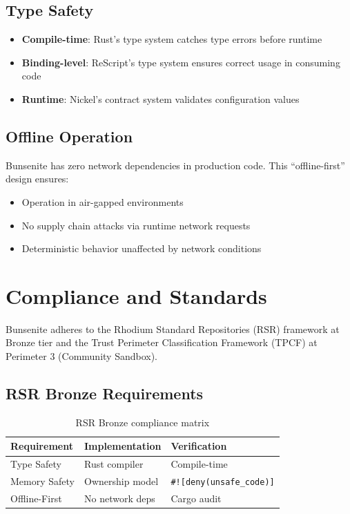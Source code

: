 \documentclass[11pt,a4paper]{article}
\begin{document}
\subsection{Type Safety}

\begin{itemize}
    \item \textbf{Compile-time}: Rust's type system catches type errors before runtime
    \item \textbf{Binding-level}: ReScript's type system ensures correct usage in consuming code
    \item \textbf{Runtime}: Nickel's contract system validates configuration values
\end{itemize}

\subsection{Offline Operation}

Bunsenite has zero network dependencies in production code. This ``offline-first'' design ensures:

\begin{itemize}
    \item Operation in air-gapped environments
    \item No supply chain attacks via runtime network requests
    \item Deterministic behavior unaffected by network conditions
\end{itemize}

\section{Compliance and Standards}

Bunsenite adheres to the Rhodium Standard Repositories (RSR) framework at Bronze tier and the Trust Perimeter Classification Framework (TPCF) at Perimeter 3 (Community Sandbox).

\subsection{RSR Bronze Requirements}

\begin{table}[htbp]
\centering
\begin{tabular}{lll}
\toprule
\textbf{Requirement} & \textbf{Implementation} & \textbf{Verification} \\
\midrule
Type Safety & Rust compiler & Compile-time \\
Memory Safety & Ownership model & \texttt{\#![deny(unsafe\_code)]} \\
Offline-First & No network deps & Cargo audit \\
\bottomrule
\end{tabular}
\caption{RSR Bronze compliance matrix}
\label{tab:rsr}
\end{table}
\end{document}
